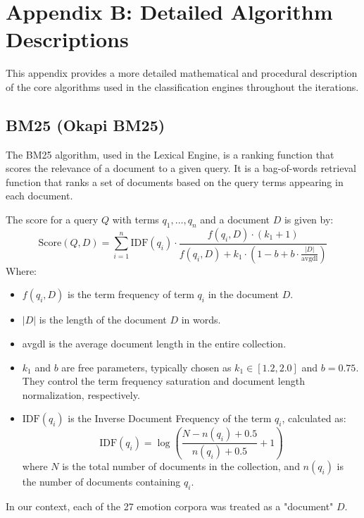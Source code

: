
\chapter{Appendix B: Detailed Algorithm Descriptions}
\label{app:algorithms}

This appendix provides a more detailed mathematical and procedural description of the core algorithms used in the classification engines throughout the iterations.

\section{BM25 (Okapi BM25)}

The BM25 algorithm, used in the Lexical Engine, is a ranking function that scores the relevance of a document to a given query. It is a bag-of-words retrieval function that ranks a set of documents based on the query terms appearing in each document.

The score for a query $Q$ with terms $q_1, \dots, q_n$ and a document $D$ is given by:
\begin{equation}
\text{Score}(Q, D) = \sum_{i=1}^{n} \text{IDF}(q_i) \cdot \frac{f(q_i, D) \cdot (k_1 + 1)}{f(q_i, D) + k_1 \cdot \left(1 - b + b \cdot \frac{|D|}{\text{avgdl}}\right)}
\end{equation}
Where:
\begin{itemize}
    \item $f(q_i, D)$ is the term frequency of term $q_i$ in the document $D$.
    \item $|D|$ is the length of the document $D$ in words.
    \item avgdl is the average document length in the entire collection.
    \item $k_1$ and $b$ are free parameters, typically chosen as $k_1 \in [1.2, 2.0]$ and $b=0.75$. They control the term frequency saturation and document length normalization, respectively.
    \item $\text{IDF}(q_i)$ is the Inverse Document Frequency of the term $q_i$, calculated as:
    \begin{equation}
    \text{IDF}(q_i) = \log\left(\frac{N - n(q_i) + 0.5}{n(q_i) + 0.5} + 1\right)
    \end{equation}
    where $N$ is the total number of documents in the collection, and $n(q_i)$ is the number of documents containing $q_i$.
\end{itemize}
In our context, each of the 27 emotion corpora was treated as a "document" $D$.

